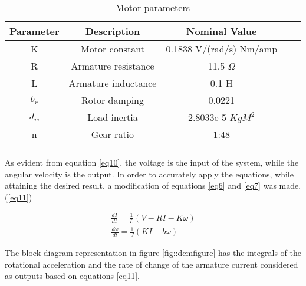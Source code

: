 \begin{table}[h]
\centering
\begin{tabular}{cccll}
\hline
Parameter                   & Description                               & Nominal Value                                 &  &  \\ \hline
\multicolumn{1}{|c|}{K}     & \multicolumn{1}{c|}{Motor constant}       & \multicolumn{1}{c|}{0.1838 V/(rad/s)  Nm/amp} &  &  \\ \cline{1-3}
\multicolumn{1}{|c|}{R}     & \multicolumn{1}{c|}{Armature resistance}  & \multicolumn{1}{c|}{11.5 $\Omega$}            &  &  \\ \cline{1-3}
\multicolumn{1}{|c|}{L}     & \multicolumn{1}{c|}{Armature inductance}  & \multicolumn{1}{c|}{0.1 H}                    &  &  \\ \cline{1-3}
\multicolumn{1}{|c|}{$b_r$} & \multicolumn{1}{c|}{Rotor damping}        & \multicolumn{1}{c|}{0.0221}                   &  &  \\ \cline{1-3}
\multicolumn{1}{|c|}{$J_w$} & \multicolumn{1}{c|}{Load inertia} & \multicolumn{1}{c|}{2.8033e-5 $KgM^2$}        &  &  \\ \cline{1-3}
\multicolumn{1}{|c|}{n}     & \multicolumn{1}{c|}{Gear ratio}           & \multicolumn{1}{c|}{1:48}                     &  &  \\ \cline{1-3}
\multicolumn{1}{l}{}        & \multicolumn{1}{l}{}                      & \multicolumn{1}{l}{}                          &  &  \\ \hline
\end{tabular}
\caption{Motor parameters}
\label{motor_par}
\end{table}

As evident from equation \ref{eq10}, the voltage is the input of the system, while the angular velocity is the output. In order to accurately apply the equations, while attaining the desired result, a modification of equations \ref{eq6} and \ref{eq7} was made.(\ref{eq11})

\begin{align}
\frac{dI}{dt} = \frac{1}{L}(V - RI - K\omega)\label{eq11} \\
\frac{d\omega}{dt} = \frac{1}{J}(KI - b\omega) \nonumber
\end{align}

The block diagram representation in figure \ref{fig::dcmfigure} has the integrals of the rotational acceleration and the rate of change of the armature current considered as outputs based on equations \ref{eq11}.

